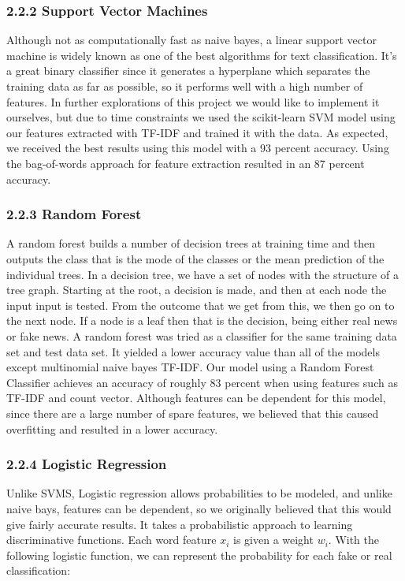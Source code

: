 \documentclass{neu_handout}
\begin{document}
\subsubsection*{2.2.2 Support Vector Machines}

Although not as computationally fast as naive bayes, a linear support vector machine is widely known as one of the best  algorithms for text classification. It's a great binary classifier since it generates a hyperplane which separates the training data as far as possible, so it performs well with a high number of features. In further explorations of this project we would like to implement it ourselves, but due to time constraints we used the scikit-learn SVM model using our features extracted with TF-IDF and trained it with the data. As expected, we received the best results using this model with a 93 percent accuracy. Using the bag-of-words approach for feature extraction resulted in an 87 percent accuracy.



\subsubsection*{2.2.3 Random Forest}

A random forest builds a number of decision trees at training time and then outputs the class that is the mode of the classes or the mean prediction of the individual trees. In a decision tree, we have a set of nodes with the structure of a tree graph. Starting at the root, a decision is made, and then at each node the input input is tested. From the outcome that we get from this, we then go on to the next node. If a node is a leaf then that is the decision, being either real news or fake news. A random forest was tried as a classifier for the same training data set and test data set. It
yielded a lower accuracy value than all of the models except multinomial naive bayes TF-IDF. Our model using a Random Forest Classifier achieves an accuracy of roughly 83 percent when using features such as TF-IDF and count vector. Although features can be dependent for this model, since there are a large number of spare features, we believed that this caused overfitting and resulted in a lower accuracy.
 
 
\subsubsection*{2.2.4 Logistic Regression}
Unlike SVMS, Logistic regression allows probabilities to be modeled, and unlike naive bays, features can be dependent, so we originally believed that this would give fairly accurate results. It takes a probabilistic approach to learning discriminative functions. Each word feature $x_i$ is given a weight $w_i$. With the following logistic function, we can represent the probability for each fake or real classification:
\end{document}
